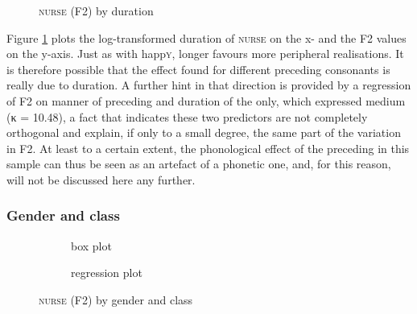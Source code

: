 \begin{figure}[h!]
	\centering
		\resizebox{0.5\linewidth}{!}{} 
	\caption{\textsc{nurse} (F2) by duration}
	\label{fig.scatter.f2w.nurse.dur}
\end{figure}

Figure \ref{fig.scatter.f2w.nurse.dur} plots the log-transformed duration of \textsc{nurse} on the x- and the F2 values on the y-axis.
Just as with happ\textsc{y}, longer  favours more peripheral realisations.
It is therefore possible that the effect found for different preceding consonants is really due to duration.
A further hint in that direction is provided by a regression of F2 on manner of preceding  and duration of the  only, which expressed medium  (κ = 10.48), a fact that indicates these two predictors are not completely orthogonal and explain, if only to a small degree, the same part of the variation in F2.
At least to a certain extent, the phonological effect of the preceding  in this sample can thus be seen as an artefact of a phonetic one, and, for this reason, will not be discussed here any further.

\subsubsection{Gender and class}
\label{sec.prod.res.vow.nurse.f2.genderclass}

\begin{figure}[h!]
	\centering
	\begin{subfigure}{.49\textwidth}
		\centering
			\resizebox{\linewidth}{!}{} 
		\caption{box plot}
		\label{fig.box.f2w.nurse.genderclass}
	\end{subfigure}
	\begin{subfigure}{.49\textwidth}
		\centering
			\resizebox{\linewidth}{!}{} 
		\caption{regression plot}
		\label{fig.scatter.f2w.nurse.genderclass}
	\end{subfigure}
	\caption{\textsc{nurse} (F2) by gender and class}
\end{figure}

